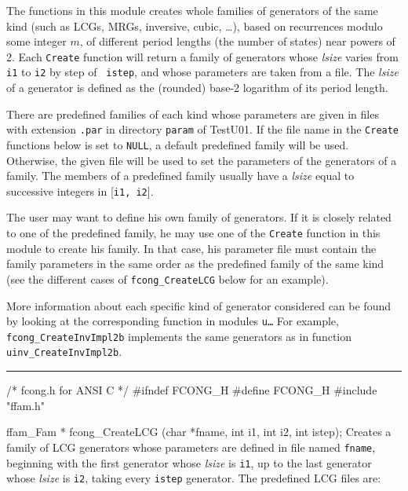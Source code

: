 
The functions in this module creates whole families of generators of the same
kind (such as LCGs, MRGs, inversive, cubic, \ldots), based on recurrences
modulo some integer $m$, of different period lengths (the number of states) 
near powers of 2.
Each {\tt Create} function will return a family of generators whose
{\it lsize\/} varies from {\tt i1} to  {\tt i2} by step of {\tt
istep}, and whose parameters are taken from a file.
The {\it lsize\/} of a generator is defined as the (rounded) base-2 
logarithm of its period length.

 There are predefined families of each
kind whose parameters are given in files with extension {\tt .par} in
directory {\tt param} of TestU01.
 If the file name in the {\tt Create} functions
below is set to {\tt NULL}, a default predefined family
will be used. Otherwise, the given file will be used to set the parameters
of the generators of a family.
The members of a predefined family usually have a  {\it lsize\/} equal
to successive integers in [{\tt i1, i2}].
%

The user may want to define his own family of generators. If it is closely
related to one of the predefined family, he may use one of the {\tt Create}
function in this module to create his family. In that case, his
parameter file must contain the family parameters in the same order as the
predefined family of the same kind
(see the different cases of {\tt fcong\_CreateLCG} below for an example).

More information about each specific kind of generator considered can
be found by looking at the corresponding function in modules {\tt u\ldots}
For example, {\tt fcong\_CreateInvImpl2b} implements the same generators
as in function {\tt uinv\_CreateInvImpl2b}.
 

\bigskip
\hrule
\code\hide
/* fcong.h  for ANSI C */
#ifndef FCONG_H
#define FCONG_H
\endhide
#include "ffam.h"
\endcode



\code

ffam_Fam * fcong_CreateLCG (char *fname, int i1, int i2, int istep);
\endcode
\tab
 Creates a family of LCG generators whose parameters
 are defined in file named {\tt fname}, beginning with the first
 generator whose {\it lsize\/} is {\tt i1}, up to the last generator whose
 {\it lsize\/} is {\tt i2}, taking every {\tt istep} generator.
 The predefined LCG files are:

